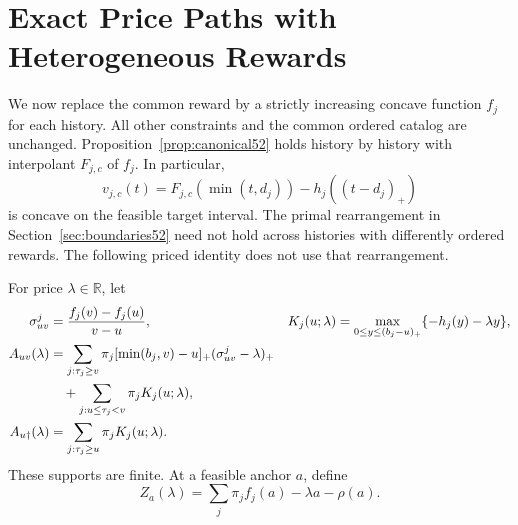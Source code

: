 \section{Exact Price Paths with Heterogeneous Rewards}\label{sec:price54}
We now replace the common reward by a strictly increasing concave function $f_j$ for each history. All other constraints and the common ordered catalog are unchanged. Proposition~\ref{prop:canonical52} holds history by history with interpolant $F_{j,c}$ of $f_j$. In particular,
\[
 v_{j,c}(t)=F_{j,c}(\min(t,d_j))-h_j((t-d_j)_+)
\]
is concave on the feasible target interval. The primal rearrangement in Section~\ref{sec:boundaries52} need not hold across histories with differently ordered rewards. The following priced identity does not use that rearrangement.

For price $\lambda\in\mathbb R$, let
\begin{align}
 \sigma^j_{uv}&=\frac{f_j(v)-f_j(u)}{v-u},&
 K_j(u;\lambda)&=\max_{0\leq y\leq(b_j-u)_+}\{-h_j(y)-\lambda y\},\label{eq:pricedpieces54}\\
 A_{uv}(\lambda)&=\sum_{j:\tau_j\geq v}\pi_j[\min(b_j,v)-u]_+(\sigma^j_{uv}-\lambda)_+\notag\\
 &\quad+\sum_{j:u\leq\tau_j<v}\pi_jK_j(u;\lambda),\label{eq:pricedarc54}\\
 A_{u\dagger}(\lambda)&=\sum_{j:\tau_j\geq u}\pi_jK_j(u;\lambda).\label{eq:pricedtail54}
\end{align}
These supports are finite. At a feasible anchor $a$, define
\[
 Z_a(\lambda)=\sum_j\pi_jf_j(a)-\lambda a-\rho(a).
\]

